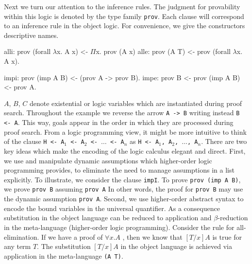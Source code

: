 \documentclass{llncs}
\begin{document}
Next we turn our attention to the inference rules. The 
judgment for provability within this logic is denoted by the
type family {\tt prov}.
Each clause will correspond to an inference rule in the object
logic. For convenience, we give the constructors descriptive names.

\begin{small}
  \begin{center}
\begin{minipage}[t]{6cm}
\begin{code}
alli: prov (forall $\lambda$x. A x)
      <- $\Pi$x. prov (A x)
alle: prov (A T)
      <- prov (forall $\lambda$x. A x).
 \end{code}
 \end{minipage}
\begin{minipage}[t]{5.5cm}
\begin{code}
impi: prov (imp A B)
      <- (prov A -> prov B).
impe: prov B
      <- prov (imp A B)
      <- prov A.

\end{code}
\end{minipage}
\end{center}
\end{small}

$A$, $B$, $C$ denote existential or logic variables which are
instantiated during proof search. Throughout the example we reverse
the arrow {\tt{A -> B}} writing instead {\tt{B <- A}}. This way, goals
appear in the order in which they are processed during proof
search. From a logic programming view, it might be more intuitive to
think of the clause {\tt{H <- A$_1$ <- A$_2$ <- $\ldots$ <- A$_n$}} as
{\tt{H <- A$_1$, A$_2$, $\ldots$, A$_n$}}. There are two key ideas
which make the encoding of the logic calculus elegant and direct.
First, we use and manipulate dynamic assumptions which higher-order
logic programming provides, to eliminate the need to manage
assumptions in a list explicitly. To illustrate, we consider the
clause {\tt impI}. To prove {\tt prov (imp A B)}, we prove {\tt prov
B} assuming {\tt prov A} In other words, the proof for {\tt prov B}
may use the dynamic assumption {\tt prov A}.  Second, we use
higher-order abstract syntax to encode the bound variables in the
universal quantifier. As a consequence substitution in the object
language can be reduced to application and $\beta$-reduction in the
meta-language (higher-order logic programming). Consider the rule for
all-elimination. If we have a proof of $\forall x.A$ , then we know
that $[T/x]A$ is true for any term $T$. The substitution $[T/x]A$ in
the object language is achieved via application in the meta-language
{\tt (A T)}.
\end{document}
